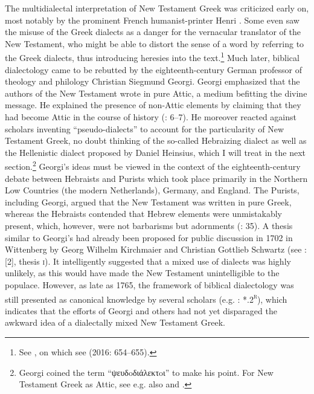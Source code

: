 The multidialectal interpretation of New Testament Greek was criticized early on, most notably by the prominent French humanist-printer Henri \citet[32–33, 138]{Estienne1581}. Some even saw the misuse of the Greek dialects as a danger for the vernacular translator of the New Testament, who might be able to distort the sense of a word by referring to the Greek dialects, thus introducing heresies into the text.\footnote{See \citet[429]{Rainolds1583}, on which see \citet[654-655]{VanRooyConsidine2016}(2016: 654–655).} Much later, biblical dialectology came to be rebutted by the eighteenth-century German professor of theology and philology Christian Siegmund Georgi. Georgi emphasized that the authors of the New Testament wrote in pure Attic, a medium befitting the divine message. He explained the presence of non-Attic elements by claiming that they had become Attic in the course of history (\citealt{Georgi1733}: 6–7). He moreover reacted against scholars inventing “pseudo-dialects” to account for the particularity of New Testament Greek, no doubt thinking of the so-called Hebraizing dialect as well as the Hellenistic dialect proposed by Daniel Heinsius, which I will treat in the next section.\footnote{Georgi coined the term “ψευδoδιάλεκτoι” to make his point. For New Testament Greek as Attic, see e.g. also \citet[3, 10-12]{Georgi1729} and \citet[b.7\textsc{\textsuperscript{r}}–b.8\textsc{\textsuperscript{v}}]{Fischer1754}.} Georgi’s ideas must be viewed in the context of the eighteenth-century debate between Hebraists and Purists which took place primarily in the Northern Low Countries (the modern Netherlands), Germany, and England. The Purists, including Georgi, argued that the New Testament was written in pure Greek, whereas the Hebraists contended that Hebrew elements were unmistakably present, which, however, were not barbarisms but adornments (\citealt{De1980}: 35). A thesis similar to Georgi’s had already been proposed for public discussion in 1702 in Wittenberg by Georg Wilhelm Kirchmaier and Christian Gottlieb Schwartz (see \citealt{Kirchmaier1702}: [2], thesis \textsc{i}). It intelligently suggested that a mixed use of dialects was highly unlikely, as this would have made the New Testament unintelligible to the populace. However, as late as 1765, the framework of biblical dialectology was still presented as canonical knowledge by several scholars (e.g. \citealt{Gottleber1765}: *.2\textsc{\textsuperscript{r}}), which indicates that the efforts of Georgi and others had not yet disparaged the awkward idea of a dialectally mixed New Testament Greek.

